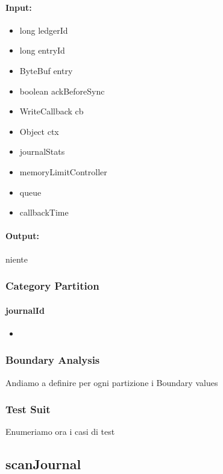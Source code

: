 \documentclass[12pt, a4paper]{article}
\begin{document}
\paragraph{Input:}
\begin{itemize}
  \item long ledgerId
  \item long entryId
  \item ByteBuf entry
  \item boolean ackBeforeSync
  \item WriteCallback cb
  \item Object ctx
  \item journalStats
  \item memoryLimitController
  \item queue
  \item callbackTime
\end{itemize}
\paragraph{Output:}
niente

\subsubsection{Category Partition}

\paragraph{journalId}
\begin{itemize}
  \item 
\end{itemize}



\subsubsection{Boundary Analysis}
Andiamo a definire per ogni partizione i Boundary values

\subsubsection{Test Suit}
Enumeriamo ora i casi di test








\subsection{scanJournal}
\end{document}
